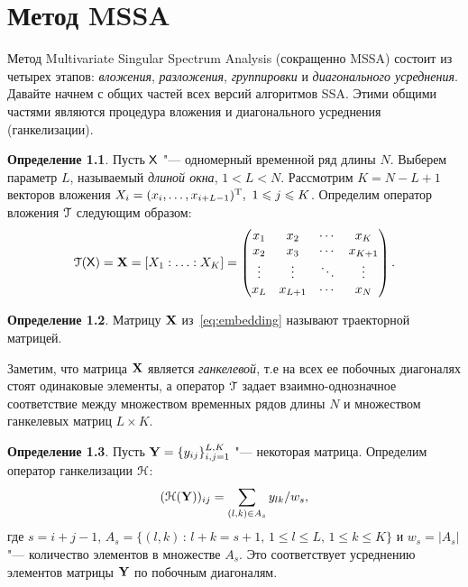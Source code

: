 \documentclass[specialist,
substylefile = spbu_report.rtx,
subf,href,colorlinks=true, 12pt]{disser}
\theoremstyle{definition}
\newtheorem{definition}{Определение}
\begin{document}
	

	\chapter{Метод MSSA}
	Метод Multivariate Singular Spectrum Analysis (сокращенно MSSA) состоит из четырех этапов: \emph{вложения}, \emph{разложения}, \emph{группировки} и \emph{диагонального усреднения}.
	Давайте начнем с общих частей всех версий алгоритмов SSA. Этими общими частями являются процедура вложения и диагонального усреднения (ганкелизации).
	\begin{definition}
		Пусть $\mathsf{X}$ "--- одномерный временной ряд длины $N$. Выберем параметр $L$, называемый \emph{длиной окна}, $1<L<N$. Рассмотрим $K=N-L+1$ векторов вложения $X_i=(x_{i},\ldots, x_{i+L-1})^{\mathrm{T}},\ 1\leqslant j \leqslant K$. Определим оператор вложения $\EuScript{T}$ следующим образом:
		\begin{equation}\label{eq:embedding}
			\EuScript{T}(\mathsf{X})=\mathbf{X}=[X_1:\ldots:X_K]=
			\begin{pmatrix}
				x_1 & x_2 & \cdots & x_K \\
				x_2 & x_3 & \cdots & x_{K+1} \\
				\vdots & \vdots & \ddots & \vdots \\
				x_L & x_{L+1} & \cdots & x_N 
			\end{pmatrix}.
		\end{equation}
	\end{definition}
	\begin{definition}
		Матрицу $\mathbf{X}$ из~\eqref{eq:embedding} называют траекторной матрицей.
	\end{definition}\noindent
	Заметим, что матрица $\mathbf{X}$ является \emph{ганкелевой}, т.е на всех ее побочных диагоналях стоят одинаковые элементы, а оператор $\EuScript{T}$ задает взаимно-однозначное соответствие между множеством временных рядов длины $N$ и множеством ганкелевых матриц $L\times K$.
		\begin{definition}
		Пусть $\mathbf{Y}=\{y_{ij}\}_{i,j=1}^{L,K}$ "--- некоторая матрица. Определим оператор ганкелизации $\EuScript{H}$:
		\begin{equation}\label{eq:averaging}
			(\EuScript{H}(\mathbf{Y}))_{ij}=\sum_{(l,k)\in A_s}y_{lk}/w_s,
		\end{equation}
		где $s=i+j-1$, $A_s=\{(l,k)\, :\, l+k=s+1,\, 1\leqslant l\leqslant L,\, 1\leqslant k\leqslant K\}$ и $w_s=|A_s|$ "--- количество элементов в множестве $A_s$. Это соответствует
		усреднению элементов матрицы $\mathbf{Y}$ по побочным диагоналям.
	\end{definition}
\end{document}

